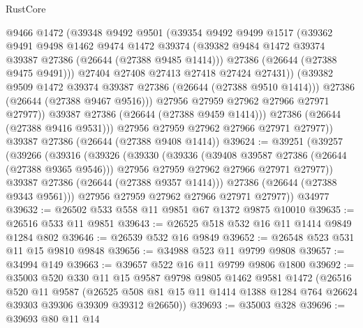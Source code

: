 \begin{lexlean}{RustCore}
\begin{coremodule}
                  @9466
                  @1472
                  (@39348
                    @9492
                    @9501
                    (@39354
                      @9492
                      @9499
                      @1517
                      (@39362
                        @9491
                        @9498
                        @1462
                        @9474
                        @1472
                        @39374
                        (@39382 @9484 @1472 @39374 @39387 @27386 (@26644 (@27388 @9485 @1414)))
                        @27386
                        (@26644 (@27388 @9475 @9491)))
                      @27404
                      @27408
                      @27413
                      @27418
                      @27424
                      @27431))
                  (@39382 @9509 @1472 @39374 @39387 @27386 (@26644 (@27388 @9510 @1414)))
                  @27386
                  (@26644 (@27388 @9467 @9516)))
                @27956
                @27959
                @27962
                @27966
                @27971
                @27977))
            @39387
            @27386
            (@26644 (@27388 @9459 @1414)))
          @27386
          (@26644 (@27388 @9416 @9531)))
        @27956
        @27959
        @27962
        @27966
        @27971
        @27977))
    @39387
    @27386
    (@26644 (@27388 @9408 @1414))
@39624 := @39251
    (@39257
      (@39266
        (@39316
          (@39326
            (@39330
              (@39336
                (@39408 @39587 @27386 (@26644 (@27388 @9365 @9546)))
                @27956
                @27959
                @27962
                @27966
                @27971
                @27977))
            @39387
            @27386
            (@26644 (@27388 @9357 @1414)))
          @27386
          (@26644 (@27388 @9343 @9561)))
        @27956
        @27959
        @27962
        @27966
        @27971
        @27977))
    @34977
@39632 := @26502 @533 @558 @11 @9851 @67 @1372 @9875 @10010
@39635 := @26516 @533 @11 @9851
@39643 := @26525 @518 @532 @16 @11 @1414 @9849 @1284 @802
@39646 := @26539 @532 @16 @9849
@39652 := @26548 @523 @531 @11 @15 @9810 @9848
@39656 := @34988 @523 @11 @9799 @9808
@39657 := @34994 @149
@39663 := @39657 @522 @16 @11 @9799 @9806 @1800
@39692 := @35003
    @520
    @330
    @11
    @15
    @9587
    @9798
    @9805
    @1462
    @9581
    @1472
    (@26516
      @520
      @11
      @9587
      (@26525 @508 @81 @15 @11 @1414 @1388 @1284 @764 @26624 @39303 @39306 @39309 @39312 @26650))
@39693 := @35003 @328
@39696 := @39693 @80 @11 @14

\end{coremodule}
\end{lexlean}
